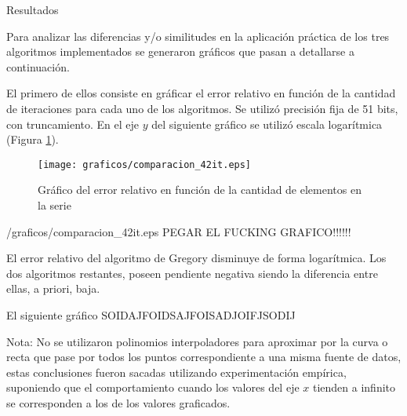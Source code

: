 \begin{section}{Resultados}

	Para analizar las diferencias y/o similitudes en la aplicación práctica de los tres algoritmos implementados se generaron gráficos que pasan a detallarse a continuación. 
		
	El primero de ellos consiste en gráficar el error relativo en función de la cantidad de iteraciones para cada uno de los algoritmos. Se utilizó precisión fija de 51 bits, con truncamiento. En el eje $y$ del siguiente gráfico se utilizó escala logarítmica (Figura \ref{fig:errorRelativo_elemSerie}).

		\begin{figure}[H]
			\centering
			\texttt{[image: graficos/comparacion\_42it.eps]}
			\caption{Gráfico del error relativo en función de la cantidad de elementos en la serie}
			\label{fig:errorRelativo_elemSerie}
		\end{figure}

	/graficos/comparacion_42it.eps PEGAR EL FUCKING GRAFICO!!!!!!

	El error relativo del algoritmo de Gregory disminuye de forma logarítmica. Los dos algoritmos restantes, poseen pendiente negativa siendo la diferencia entre ellas, a priori, baja.

	El siguiente gráfico SOIDAJFOIDSAJFOISADJOIFJSODIJ

	Nota: No se utilizaron polinomios interpoladores para aproximar por la curva o recta que pase por todos los puntos correspondiente a una misma fuente de datos, estas conclusiones fueron sacadas utilizando experimentación empírica, suponiendo que el comportamiento cuando los valores del eje $x$ tienden a infinito se corresponden a los de los valores graficados.

\end{section}
